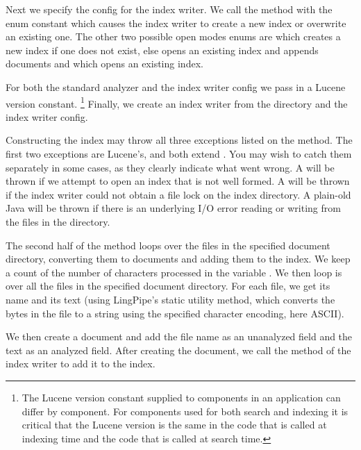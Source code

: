 Next we specify the config for the index writer.  We call the
 method with the enum constant
 which causes the index writer
to create a new index or overwrite an existing one.  The other two
possible open modes enums are
 which creates a
new index if one does not exist, else opens an existing index
and appends documents and 
which opens an existing index.

For both the standard analyzer and the index writer
config we pass in a Lucene version constant.%
%
\footnote{The Lucene version constant supplied to components
in an application can differ by component.
For components used for both search and indexing it is critical
that the Lucene version is the same in the code that is called
at indexing time and the code that is called at search time.}
%
Finally, we create an index writer from the directory and the
index writer config.

Constructing the index may throw all three exceptions listed on the
 method.  The first two exceptions are Lucene's, and both
extend .  You may wish to catch them separately in
some cases, as they clearly indicate what went wrong. A
 will be thrown if we attempt to open an
index that is not well formed.  A 
will be thrown if the index writer could not obtain a file lock on the
index directory.  A plain-old Java  will be thrown
if there is an underlying I/O error reading or writing from the files
in the directory.

The second half of the  method loops over the files
in the specified document directory, converting them to documents
and adding them to the index.
%
%
We keep a count of the number of characters processed in the variable
.  We then loop is over all the files in the specified
document directory.  For each file, we get its name and its text
(using LingPipe's static  utility method, which
converts the bytes in the file to a string using the specified
character encoding, here ASCII).  

We then create a document and add the file name as an unanalyzed field
and the text as an analyzed field.  After creating the document, we
call the  method of the index writer to
add it to the index.

